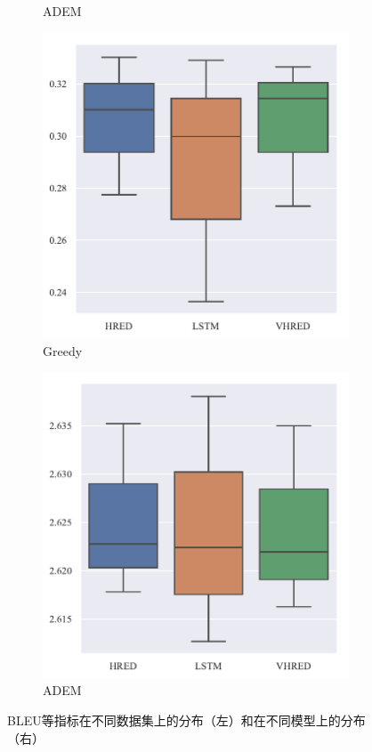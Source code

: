 \begin{figure}[H]
\begin{subfigure}{0.24\linewidth}
        \centering
        \caption{ADEM}
        \label{subfig:ADEM_dataset}
    \end{subfigure}%
    \begin{subfigure}{0.24\linewidth}
        \includegraphics[width=\linewidth]{figure/boxplot/model/embedding_based_greedy_matching/plot.pdf}
        \centering
        \caption{Greedy}
    \end{subfigure}%
    \begin{subfigure}{0.24\linewidth}
        \includegraphics[width=\linewidth]{figure/boxplot/model/adem/plot.pdf}
        \centering
        \caption{ADEM}
    \end{subfigure}
    \centering
    \caption{BLEU等指标在不同数据集上的分布（左）和在不同模型上的分布（右）}
\end{figure}
